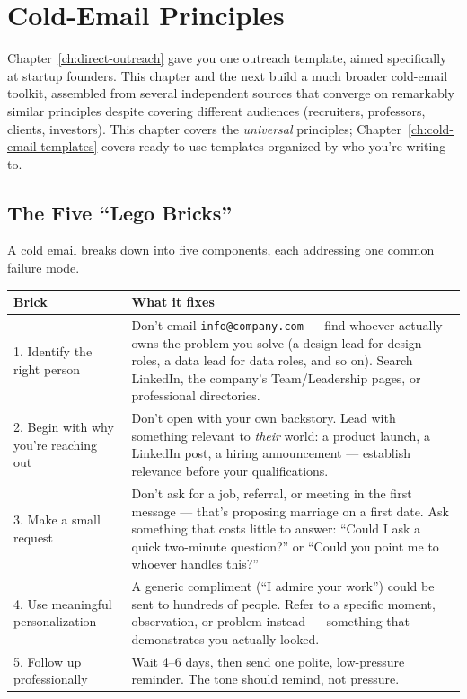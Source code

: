 \chapter{Cold-Email Principles}
\label{ch:cold-email-principles}

Chapter~\ref{ch:direct-outreach} gave you one outreach template, aimed specifically at startup founders. This
chapter and the next build a much broader cold-email toolkit, assembled from several independent sources that
converge on remarkably similar principles despite covering different audiences (recruiters, professors, clients,
investors). This chapter covers the \emph{universal} principles; Chapter~\ref{ch:cold-email-templates} covers
ready-to-use templates organized by who you're writing to.

\section{The Five ``Lego Bricks''}

A cold email breaks down into five components, each addressing one common failure mode.

\begin{longtable}{p{} p{}}
\toprule
\textbf{Brick} & \textbf{What it fixes} \\
\midrule
\endhead
1. Identify the right person & Don't email \texttt{info@company.com} — find whoever actually owns the problem
you solve (a design lead for design roles, a data lead for data roles, and so on). Search LinkedIn, the
company's Team/Leadership pages, or professional directories. \\
2. Begin with why you're reaching out & Don't open with your own backstory. Lead with something relevant to
\emph{their} world: a product launch, a LinkedIn post, a hiring announcement — establish relevance before your
qualifications. \\
3. Make a small request & Don't ask for a job, referral, or meeting in the first message — that's proposing
marriage on a first date. Ask something that costs little to answer: ``Could I ask a quick two-minute
question?'' or ``Could you point me to whoever handles this?'' \\
4. Use meaningful personalization & A generic compliment (``I admire your work'') could be sent to hundreds of
people. Refer to a specific moment, observation, or problem instead — something that demonstrates you actually
looked. \\
5. Follow up professionally & Wait 4--6 days, then send one polite, low-pressure reminder. The tone should
remind, not pressure. \\
\bottomrule
\end{longtable}

